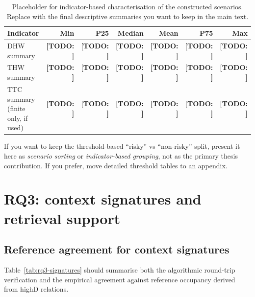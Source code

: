 \documentclass[12pt,a4paper,twoside,openright]{report}
\newcommand{\TODO}[1]{\textbf{[TODO: #1]}}
\begin{document}
    \begin{table}[H]
        \centering
        \caption{Placeholder for indicator-based characterisation of the constructed scenarios. Replace with the final descriptive summaries you want to keep in the main text.}
        \label{tab:rq2-indicators}
        {\small
        \setlength{\tabcolsep}{4pt}
            \begin{tabular}{@{}lrrrrrr@{}}
                \toprule
                Indicator & Min & P25 & Median & Mean & P75 & Max \\
                \midrule
                DHW summary & \TODO{} & \TODO{} & \TODO{} & \TODO{} & \TODO{} & \TODO{} \\
                THW summary & \TODO{} & \TODO{} & \TODO{} & \TODO{} & \TODO{} & \TODO{} \\
                TTC summary (finite only, if used) & \TODO{} & \TODO{} & \TODO{} & \TODO{} & \TODO{} & \TODO{} \\
                \bottomrule
            \end{tabular}}
    \end{table}

    If you want to keep the threshold-based ``risky'' vs ``non-risky'' split, present it here as \emph{scenario sorting} or \emph{indicator-based grouping}, not as the primary thesis contribution. If you prefer, move detailed threshold tables to an appendix.

    \section{RQ3: context signatures and retrieval support}
    \subsection{Reference agreement for context signatures}
    Table~\ref{tab:rq3-signatures} should summarise both the algorithmic round-trip verification and the empirical agreement against reference occupancy derived from highD relations.
\end{document}
